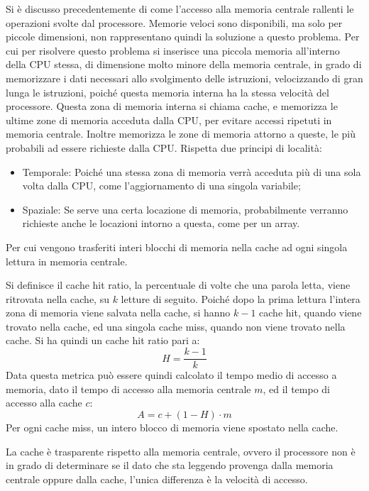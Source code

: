 \documentclass{article}
\numberwithin{equation}{subsection}
\begin{document}
Si è discusso precedentemente di come l'accesso alla memoria centrale rallenti le operazioni svolte dal processore. Memorie veloci sono disponibili, ma solo per piccole dimensioni, non rappresentano quindi la 
soluzione a questo problema. Per cui per risolvere questo problema si inserisce una piccola memoria all'interno della CPU stessa, di dimensione molto minore della memoria centrale, in grado di memorizzare i dati 
necessari allo svolgimento delle istruzioni, velocizzando di gran lunga le istruzioni, poiché questa memoria interna ha la stessa velocità del processore. 
Questa zona di memoria interna si chiama cache, e memorizza le ultime zone di memoria acceduta dalla CPU, per evitare accessi ripetuti in memoria centrale. Inoltre memorizza le zone di memoria attorno a queste, 
le più probabili ad essere richieste dalla CPU. 
Rispetta due principi di località:
\begin{itemize}
    \item Temporale: Poiché una stessa zona di memoria verrà acceduta più di una sola volta dalla CPU, come l'aggiornamento di una singola variabile;
    \item Spaziale: Se serve una certa locazione di memoria, probabilmente verranno richieste anche le locazioni intorno a questa, come per un array. 
\end{itemize}     
Per cui vengono trasferiti interi blocchi di memoria nella cache ad ogni singola lettura in memoria centrale. 

Si definisce il cache hit ratio, la percentuale di volte che una parola letta, viene ritrovata nella cache, su $k$ letture di seguito. Poiché dopo la prima lettura l'intera zona di memoria viene salvata nella cache, 
si hanno $k-1$ cache hit, quando viene trovato nella cache, ed una singola cache miss, quando non viene trovato nella cache. Si ha quindi un cache hit ratio pari a:
\begin{equation}
    H=\displaystyle\frac{k-1}{k}
\end{equation}
Data questa metrica può essere quindi calcolato il tempo medio di accesso a memoria, dato il tempo di accesso alla memoria centrale $m$, ed il tempo di accesso alla cache $c$: 
\begin{equation}
    A=c+(1-H)\cdot m
\end{equation}
Per ogni cache miss, un intero blocco di memoria viene spostato nella cache. 

La cache è trasparente rispetto alla memoria centrale, ovvero il processore non è in grado di determinare se il dato che sta leggendo provenga dalla memoria centrale oppure dalla cache, l'unica differenza è la velocità 
di accesso. 
\end{document}
